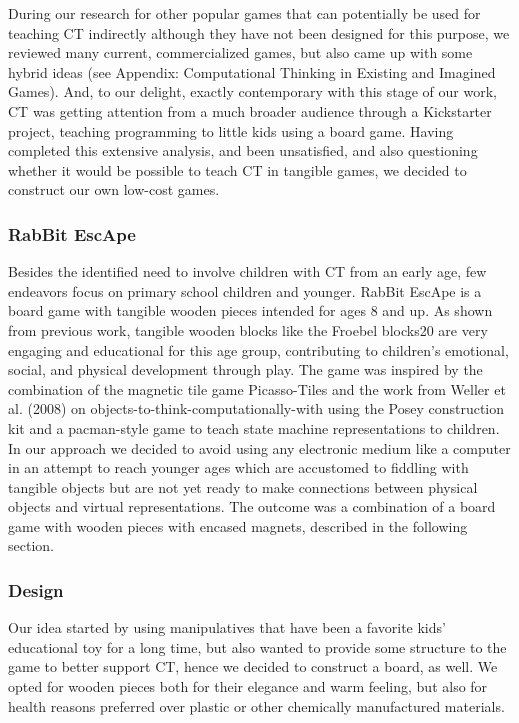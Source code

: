 \documentclass{acm_proc_article-sp}
\begin{document}
During our research for other popular games that can potentially be used for teaching CT indirectly although they have not been designed for this purpose, we reviewed many current, commercialized games, but also came up with some hybrid ideas (see Appendix: Computational Thinking in Existing and Imagined Games). And, to our delight, exactly contemporary with this stage of our work, CT was getting attention from a much broader audience through a Kickstarter project, teaching programming to little kids using a board game. Having completed this extensive analysis, and been unsatisfied, and also questioning whether it would be possible to teach CT in tangible games, we decided to construct our own low-cost games.

\subsubsection{RabBit EscApe}
Besides the identified need to involve children with CT from an early age, few endeavors focus on primary school children and younger. RabBit EscApe is a board game with tangible wooden pieces intended for ages 8 and up. As shown from previous work, tangible wooden blocks like the Froebel blocks20 are very engaging and educational for this age group, contributing to children’s emotional, social, and physical development through play. The game was inspired by the combination of the magnetic tile game Picasso-Tiles and the work from Weller et al. (2008) on objects-to-think-computationally-with using the Posey construction kit and a pacman-style game to teach state machine representations to children. In our approach we decided to avoid using any electronic medium like a computer in an attempt to reach younger ages which are accustomed to fiddling with tangible objects but are not yet ready to make connections between physical objects and virtual representations. The outcome was a combination of a board game with wooden pieces with encased magnets, described in the following section.

\subsubsection{Design}
Our idea started by using manipulatives that have been a favorite kids’ educational toy for a long time, but also wanted to provide some structure to the game to better support CT, hence we decided to construct a board, as well. We opted for wooden pieces both for their elegance and warm feeling, but also for health reasons preferred over plastic or other chemically manufactured materials. 
\end{document}
